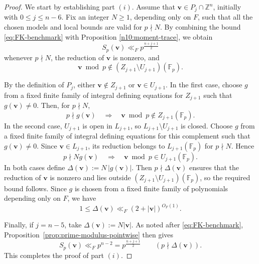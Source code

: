 \documentclass[a4paper,11pt, twoside,reqno]{amsart}
\theoremstyle{plain}
\theoremstyle{definition}
\theoremstyle{remark}
\newcommand{\bfv}{\bm{v}}
\newcommand{\ZZ}{\mathbb{Z}}
\renewcommand{\le}{\leqslant}
\renewcommand{\ge}{\geqslant}
\newcommand{\FF}{\mathbb{F}}
\numberwithin{equation}{section}
\begin{document}
\begin{proof}
We start by establishing part $(i)$. Assume that
$\bfv\in P_j\cap\ZZ^n$, initially with
$0\le j\le n-6$. Fix an integer $N\ge1$, depending only on
$F$, such that all the chosen models and local bounds are
valid for $p\nmid N$.
By combining the bound \eqref{eq:FK-benchmark} with
Proposition \ref{n10:moment-trace}, we obtain
\[
S_p(\bfv)\ll_F p^{\frac{n+j+1}{2}}
\]
whenever $p\nmid N$, the reduction of $\bfv$ is nonzero,
and
\begin{equation}
\label{EQ:modified-FK-condition}
\bfv\bmod p\notin
(Z_{j+1}\setminus U_{j+1})(\FF_p).
\end{equation}

By the definition of $P_j$, either $\bfv\notin Z_{j+1}$
or $\bfv\in U_{j+1}$. In the first case, choose $g$ from
a fixed finite family of integral defining equations for
$Z_{j+1}$ such that $g(\bfv)\ne0$. Then, for $p\nmid N$,
\[
p\nmid g(\bfv)
\quad\Longrightarrow\quad
\bfv\bmod p\notin Z_{j+1}(\FF_p).
\]
In the second case, $U_{j+1}$ is open in $L_{j+1}$, so
$L_{j+1}\setminus U_{j+1}$ is closed. Choose $g$ from
a fixed finite family of integral defining equations for
this complement such that $g(\bfv)\ne0$. Since
$\bfv\in L_{j+1}$, its reduction belongs to
$L_{j+1}(\FF_p)$ for $p\nmid N$. Hence
\[
p\nmid Ng(\bfv)
\quad\Longrightarrow\quad
\bfv\bmod p\in U_{j+1}(\FF_p).
\]
In both cases define
$\Delta(\bfv):=N\,|g(\bfv)|$.
Then $p\nmid\Delta(\bfv)$ ensures that the reduction of
$\bfv$ is nonzero and lies outside
$(Z_{j+1}\setminus U_{j+1})(\FF_p)$, so the required
bound follows. Since $g$ is chosen from a fixed finite
family of polynomials depending only on $F$, we have
\[
1\le\Delta(\bfv)\ll_F(2+|\bfv|)^{O_F(1)}.
\]

Finally, if $j=n-5$, take
$\Delta(\bfv):=N|\bfv|$.
As noted after \eqref{eq:FK-benchmark},
Proposition~\ref{prop:prime-modulus-pointwise} then gives
\[
S_p(\bfv)\ll_F p^{n-2}
=p^{\frac{n+j+1}{2}}
\qquad(p\nmid\Delta(\bfv)).
\]
This completes the proof of part $(i)$.



\end{proof}
\end{document}
